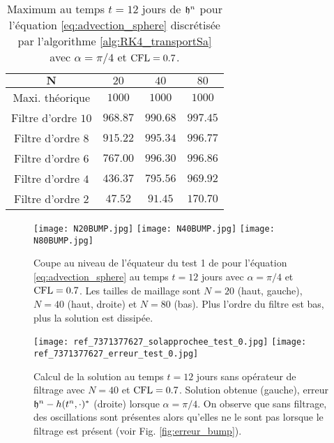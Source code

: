 \begin{table}[htbp]
\begin{center}
\begin{tabular}{|c||ccc|}
\hline 
$\mathbf{N}$ & $20$ & $40$ & $80$ \\ 
\hline 
\hline 
Maxi. théorique & $1000$ & $1000$ & $1000$ \\ 
Filtre d'ordre $10$ & $968.87$ & $990.68$ & $997.45$ \\ 
Filtre d'ordre $8$ & $915.22$ & $995.34$ & $996.77$ \\ 
Filtre d'ordre $6$ & $767.00$ & $996.30$ & $996.86$ \\  
Filtre d'ordre $4$ & $436.37$ & $795.56$ & $969.92$ \\ 
Filtre d'ordre $2$ & $47.52$ & $91.45$ & $170.70$ \\ 
\hline 
\end{tabular} 
\end{center}
\caption{Maximum au temps $t=12$ jours de $\mathfrak{h}^n$ pour l'équation \eqref{eq:advection_sphere} discrétisée par l'algorithme \ref{alg:RK4_transportSa} avec $\alpha = \pi / 4$ et $\text{CFL} = 0.7$.}
\label{tab:max_bump}
\end{table} 

\begin{figure}[htbp]
\begin{center}
\texttt{[image: N20BUMP.jpg]}
\texttt{[image: N40BUMP.jpg]}
\texttt{[image: N80BUMP.jpg]}
\end{center}
\caption{Coupe au niveau de l'équateur du test 1 de \cite{Williamson1992} pour l'équation \eqref{eq:advection_sphere} au temps $t=12$ jours avec $\alpha = \pi / 4$ et $\text{CFL} = 0.7$. Les tailles de maillage sont $N=20$ (haut, gauche), $N=40$ (haut, droite) et $N=80$ (bas). Plus l'ordre du filtre est bas, plus la solution est dissipée.}
\label{fig:max_bump}
\end{figure}

\begin{figure}[htbp]
\begin{center}
\texttt{[image: ref\_7371377627\_solapprochee\_test\_0.jpg]}
\texttt{[image: ref\_7371377627\_erreur\_test\_0.jpg]}
\end{center}
\caption{Calcul de la solution au temps $t=12$ jours sans opérateur de filtrage avec $N=40$ et $\text{CFL} = 0.7$. Solution obtenue (gauche), erreur $\mathfrak{h}^n - h(t^n,\cdot)^*$ (droite) lorsque $\alpha = \pi/4$. On observe que sans filtrage, des oscillations sont présentes alors qu'elles ne le sont pas lorsque le filtrage est présent (voir Fig. \ref{fig:erreur_bump}).}
\label{fig:parasite_bump}
\end{figure}









